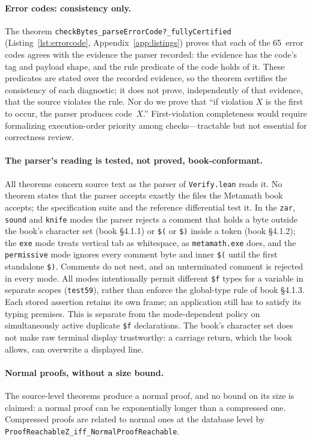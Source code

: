 \documentclass[11pt]{article}
\newcommand{\lean}[1]{\lstinline[language=Lean4]{#1}}
\newcommand{\leansmall}[1]{\lstinline[language=Lean4,basicstyle=\ttfamily\footnotesize]{#1}}
\newcommand{\file}[1]{\texttt{#1}}
\begin{document}
\paragraph{Error codes: consistency only.}
The theorem \leansmall{checkBytes_parseErrorCode?_fullyCertified}
(Listing~\ref{lst:errorcode}, Appendix~\ref{app:listings})
proves that each of the 65~error codes agrees with the evidence the parser
recorded: the evidence has the code's tag and payload shape, and the rule
predicate of the code holds of it.  These predicates
are stated over the recorded evidence, so the theorem certifies the consistency
of each diagnostic; it does not prove, independently of that evidence, that the
source violates the rule.
Nor do we prove that ``if violation $X$ is
the first to occur, the parser produces code~$X$.''
First-violation completeness would require formalizing execution-order
priority among checks---tractable but not essential for correctness
review.

\paragraph{The parser's reading is tested, not proved, book-conformant.}
All theorems concern source text as the parser of \file{Verify.lean}
reads it.  No theorem states that the parser accepts exactly the files
the Metamath book accepts; the specification suite and the reference
differential test it.  In the \texttt{zar}, \texttt{sound} and
\texttt{knife} modes the parser rejects a comment that holds a byte
outside the book's character set (book \S4.1.1) or \verb|$(| or
\verb|$)| inside a token (book \S4.1.2); the \texttt{exe} mode treats
vertical tab as whitespace, as \texttt{metamath.exe} does, and the
\texttt{permissive} mode ignores every comment byte and inner \verb|$(|
until the first standalone \verb|$)|.  Comments do not nest, and an
unterminated comment is rejected in every mode.  All modes intentionally
permit different \verb|$f| types for a variable in separate scopes
(\texttt{test59}), rather than enforce the global-type rule of book
\S4.1.3.  Each stored assertion retains its own frame; an application
still has to satisfy its typing premises.  This is separate from the
mode-dependent policy on simultaneously active duplicate \verb|$f|
declarations.  The book's
character set does not make raw terminal display trustworthy: a carriage
return, which the book allows, can overwrite a displayed line.

\paragraph{Normal proofs, without a size bound.}
The source-level theorems produce a normal proof, and no bound on its
size is claimed: a normal proof can be exponentially longer than a
compressed one.  Compressed proofs are related to normal ones at the
database level by \lean{ProofReachableZ_iff_NormalProofReachable}.
\end{document}
